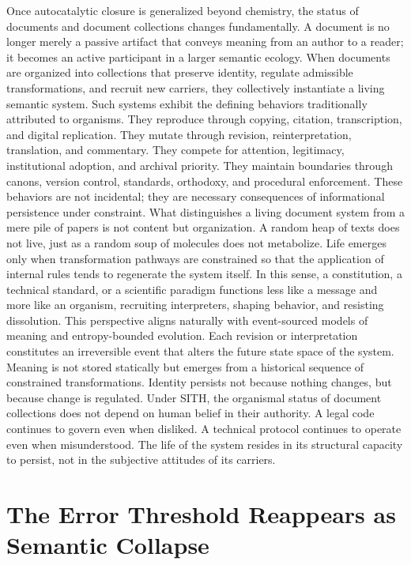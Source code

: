 \documentclass[11pt,oneside]{article}
\begin{document}
Once autocatalytic closure is generalized beyond chemistry, the status of documents and document collections changes fundamentally. A document is no longer merely a passive artifact that conveys meaning from an author to a reader; it becomes an active participant in a larger semantic ecology. When documents are organized into collections that preserve identity, regulate admissible transformations, and recruit new carriers, they collectively instantiate a living semantic system.
Such systems exhibit the defining behaviors traditionally attributed to organisms. They reproduce through copying, citation, transcription, and digital replication. They mutate through revision, reinterpretation, translation, and commentary. They compete for attention, legitimacy, institutional adoption, and archival priority. They maintain boundaries through canons, version control, standards, orthodoxy, and procedural enforcement. These behaviors are not incidental; they are necessary consequences of informational persistence under constraint.
What distinguishes a living document system from a mere pile of papers is not content but organization. A random heap of texts does not live, just as a random soup of molecules does not metabolize. Life emerges only when transformation pathways are constrained so that the application of internal rules tends to regenerate the system itself. In this sense, a constitution, a technical standard, or a scientific paradigm functions less like a message and more like an organism, recruiting interpreters, shaping behavior, and resisting dissolution.
This perspective aligns naturally with event-sourced models of meaning and entropy-bounded evolution. Each revision or interpretation constitutes an irreversible event that alters the future state space of the system. Meaning is not stored statically but emerges from a historical sequence of constrained transformations. Identity persists not because nothing changes, but because change is regulated.
Under SITH, the organismal status of document collections does not depend on human belief in their authority. A legal code continues to govern even when disliked. A technical protocol continues to operate even when misunderstood. The life of the system resides in its structural capacity to persist, not in the subjective attitudes of its carriers.

\section{The Error Threshold Reappears as Semantic Collapse}
\end{document}

